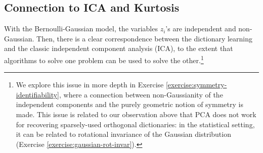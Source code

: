 \documentclass[../../book-main.tex]{subfiles}
\begin{document}
%
%



\subsection{Connection to ICA and Kurtosis}
With the Bernoulli-Gaussian model, the variables $z_i$'s are independent and non-Gaussian. Then, there is a clear correspondence between the dictionary learning and the classic independent component analysis (ICA), to the extent that algorithms to solve one problem can be used to solve the other.\footnote{We explore this issue in more depth in Exercise \ref{exercise:symmetry-identifiability}, where a connection between non-Gaussianity of the independent components and the purely geometric notion of symmetry is made. This issue is related to our observation above that PCA does not work for recovering sparsely-used orthogonal dictionaries: in the statistical setting, it can be related to rotational invariance of the Gaussian distribution (Exercise \ref{exercise:gaussian-rot-invar}).} 
\end{document}
